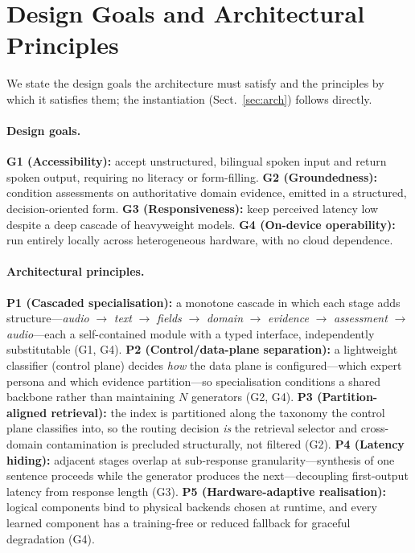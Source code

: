 \documentclass[runningheads]{llncs}
\begin{document}
\section{Design Goals and Architectural Principles}
\label{sec:principles}

We state the design goals the architecture must satisfy and the principles by which it satisfies them; the instantiation (Sect.~\ref{sec:arch}) follows directly.

\paragraph{Design goals.}
\textbf{G1 (Accessibility):} accept unstructured, bilingual spoken input and return spoken output, requiring no literacy or form-filling. \textbf{G2 (Groundedness):} condition assessments on authoritative domain evidence, emitted in a structured, decision-oriented form. \textbf{G3 (Responsiveness):} keep perceived latency low despite a deep cascade of heavyweight models. \textbf{G4 (On-device operability):} run entirely locally across heterogeneous hardware, with no cloud dependence.

\paragraph{Architectural principles.}
\textbf{P1 (Cascaded specialisation):} a monotone cascade in which each stage adds structure---\emph{audio} $\rightarrow$ \emph{text} $\rightarrow$ \emph{fields} $\rightarrow$ \emph{domain} $\rightarrow$ \emph{evidence} $\rightarrow$ \emph{assessment} $\rightarrow$ \emph{audio}---each a self-contained module with a typed interface, independently substitutable (G1, G4). \textbf{P2 (Control/data-plane separation):} a lightweight classifier (control plane) decides \emph{how} the data plane is configured---which expert persona and which evidence partition---so specialisation conditions a shared backbone rather than maintaining $N$ generators (G2, G4). \textbf{P3 (Partition-aligned retrieval):} the index is partitioned along the taxonomy the control plane classifies into, so the routing decision \emph{is} the retrieval selector and cross-domain contamination is precluded structurally, not filtered (G2). \textbf{P4 (Latency hiding):} adjacent stages overlap at sub-response granularity---synthesis of one sentence proceeds while the generator produces the next---decoupling first-output latency from response length (G3). \textbf{P5 (Hardware-adaptive realisation):} logical components bind to physical backends chosen at runtime, and every learned component has a training-free or reduced fallback for graceful degradation (G4).
\end{document}
